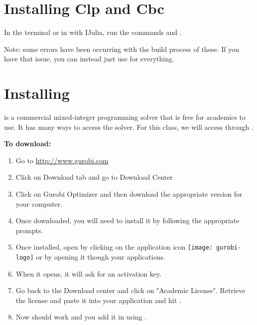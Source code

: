 \section{Installing \protect\coin Clp and Cbc}
In the \julia terminal or in \jupyter with IJulia, run the commands  and .

Note: some errors have been occurring with the build process of these.  If you have that issue, you can instead just use \gurobi for everything.
\section{Installing \protect\gurobi}
\gurobi is a commercial mixed-integer programming solver that is free for academics to use.  It has many ways to access the solver.  For this class, we will access \gurobi through \julia.  

\noindent \textbf{  To download:}
\begin{enumerate}
\item Go to \url{http://www.gurobi.com}
\item  Click on Download tab and  go to Download Center
\item Click on Gurobi Optimizer and then download the appropriate version for your computer.
\item Once downloaded, you will need to install it by following the appropriate prompts.
\item Once installed, open \gurobi by clicking on the application icon \texttt{[image: gurobi-logo]} or by opening it though your applications.
\item When it opens, it will ask for an activation key.
\item Go back to the Download center and click on "Academic License".  Retrieve the license and paste it into your \gurobi application and hit \code{[enter]}.  
\item Now \gurobi should work and you add it in \julia using .
\end{enumerate}

